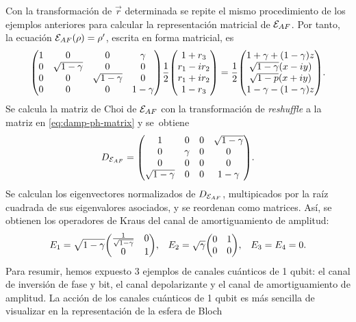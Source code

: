 Con la transformación de $\vec{r}$ determinada se repite 
el mismo procedimiento de los ejemplos anteriores 
para calcular la representación matricial de $\mathcal{E}_{AF}$. 
Por tanto, la ecuación $\mathcal{E}_{AF}(\rho)=\rho'$, escrita 
en forma matricial, es 
\begin{align}
\mqty(
 1 & 0 & 0 & \gamma  \\
 0 & \sqrt{1-\gamma } & 0 & 0 \\
 0 & 0 & \sqrt{1-\gamma } & 0 \\
 0 & 0 & 0 & 1-\gamma  
)
\frac{1}{2}
\mqty(
1+r_3\\r_1-ir_2\\r_1+ir_2\\1-r_3
)
=
\frac{1}{2}
\mqty(
1+\gamma+\qty(1-\gamma)z\\
\sqrt{1-\gamma}\qty(x-i y)\\
\sqrt{1-p}\qty(x+i y)\\
1-\gamma-\qty(1-\gamma)z
).
\label{eq:damp-ph-matrix}
\end{align}
Se calcula la matriz de Choi de $\mathcal{E}_{AF}$ con la transformación
de \textit{reshuffle} a la matriz en \eqref{eq:damp-ph-matrix}
y se~obtiene
\begin{align}
D_{\E_{AF}}=
\mqty(
 1 & 0 & 0 & \sqrt{1-\gamma } \\
 0 & \gamma  & 0 & 0 \\
 0 & 0 & 0 & 0 \\
 \sqrt{1-\gamma } & 0 & 0 & 1-\gamma  
).
\end{align}
Se calculan los eigenvectores normalizados de $D_{\mathcal{E}_{AF}}$, multipicados
por la raíz cuadrada de sus eigenvalores asociados, y se reordenan
como matrices. Así, se obtienen los operadores de Kraus 
del canal de amortiguamiento de amplitud:
\begin{align}
E_1&=
\sqrt{1-\gamma }
\mqty(
\frac{1}{\sqrt{1-\gamma }} & 0 \\
0 & 1
),&
E_2&=
\sqrt{\gamma }
\mqty(
0 & 1 \\
0 & 0 
),
&
E_3=E_4=0.
\end{align}
Para resumir, hemos expuesto 3 ejemplos de canales cuánticos de 1 qubit:
el canal de inversión de fase y bit, el canal depolarizante 
y el canal de amortiguamiento
de amplitud. La acción de los canales cuánticos de 1 qubit 
es más sencilla de visualizar en la representación de la esfera de Bloch
